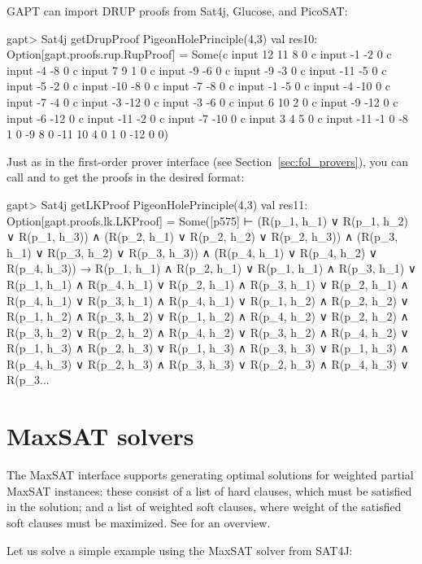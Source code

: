 \documentclass[a4paper,11pt]{book}
\newcommand{\cli}[1]{{\ttfamily {#1}}}
\begin{document}
GAPT can import DRUP proofs from Sat4j, Glucose, and PicoSAT:
\begin{clilisting}
gapt> Sat4j getDrupProof PigeonHolePrinciple(4,3)
val res10: Option[gapt.proofs.rup.RupProof] =
Some(c input 12 11 8 0
c input -1 -2 0
c input -4 -8 0
c input 7 9 1 0
c input -9 -6 0
c input -9 -3 0
c input -11 -5 0
c input -5 -2 0
c input -10 -8 0
c input -7 -8 0
c input -1 -5 0
c input -4 -10 0
c input -7 -4 0
c input -3 -12 0
c input -3 -6 0
c input 6 10 2 0
c input -9 -12 0
c input -6 -12 0
c input -11 -2 0
c input -7 -10 0
c input 3 4 5 0
c input -11 -1 0
-8 1 0
-9 8 0
-11 10 4 0
1 0
-12 0
 0)

\end{clilisting}

Just as in the first-order prover interface (see Section~\ref{sec:fol_provers}), you can call
\cli{getResolutionProof} and \cli{getLKProof} to get the proofs in the desired
format:
\begin{clilisting}
gapt> Sat4j getLKProof PigeonHolePrinciple(4,3)
val res11: Option[gapt.proofs.lk.LKProof] =
Some([p575]
⊢
(R(p_1, h_1) ∨ R(p_1, h_2) ∨ R(p_1, h_3)) ∧
    (R(p_2, h_1) ∨ R(p_2, h_2) ∨ R(p_2, h_3)) ∧
    (R(p_3, h_1) ∨ R(p_3, h_2) ∨ R(p_3, h_3)) ∧
    (R(p_4, h_1) ∨ R(p_4, h_2) ∨ R(p_4, h_3)) →
  R(p_1, h_1) ∧ R(p_2, h_1) ∨
    R(p_1, h_1) ∧ R(p_3, h_1) ∨
    R(p_1, h_1) ∧ R(p_4, h_1) ∨
    R(p_2, h_1) ∧ R(p_3, h_1) ∨
    R(p_2, h_1) ∧ R(p_4, h_1) ∨
    R(p_3, h_1) ∧ R(p_4, h_1) ∨
    R(p_1, h_2) ∧ R(p_2, h_2) ∨
    R(p_1, h_2) ∧ R(p_3, h_2) ∨
    R(p_1, h_2) ∧ R(p_4, h_2) ∨
    R(p_2, h_2) ∧ R(p_3, h_2) ∨
    R(p_2, h_2) ∧ R(p_4, h_2) ∨
    R(p_3, h_2) ∧ R(p_4, h_2) ∨
    R(p_1, h_3) ∧ R(p_2, h_3) ∨
    R(p_1, h_3) ∧ R(p_3, h_3) ∨
    R(p_1, h_3) ∧ R(p_4, h_3) ∨
    R(p_2, h_3) ∧ R(p_3, h_3) ∨
    R(p_2, h_3) ∧ R(p_4, h_3) ∨
    R(p_3...

\end{clilisting}

\section{MaxSAT solvers}

The MaxSAT interface supports generating optimal solutions for weighted partial
MaxSAT instances: these consist of a list of hard clauses, which must be
satisfied in the solution; and a list of weighted soft clauses, where weight of
the satisfied soft clauses must be maximized.  See \cite{Argelich2008First}
for an overview.

Let us solve a simple example using the MaxSAT solver from SAT4J:
\end{document}
